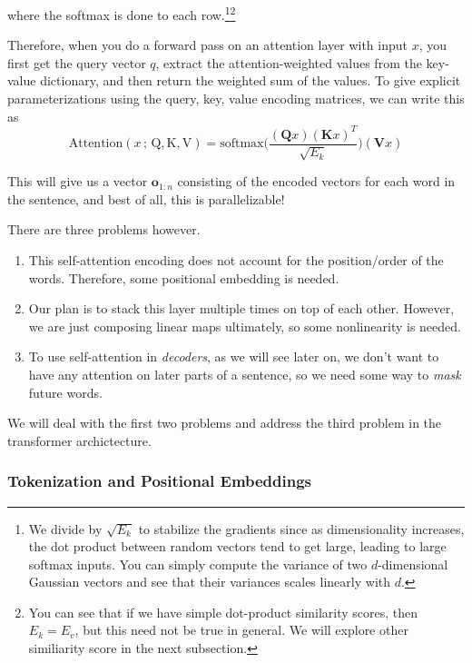 \begin{definition}
      where the softmax is done to each row.\footnote{We divide by $\sqrt{E_k}$ to stabilize the gradients since as dimensionality increases, the dot product between random vectors tend to get large, leading to large softmax inputs. You can simply compute the variance of two $d$-dimensional Gaussian vectors and see that their variances scales linearly with $d$. }\footnote{You can see that if we have simple dot-product similarity scores, then $E_k = E_v$, but this need not be true in general. We will explore other similiarity score in the next subsection. } 

      Therefore, when you do a forward pass on an attention layer with input $x$, you first get the query vector $q$, extract the attention-weighted values from the key-value dictionary, and then return the weighted sum of the values. To give explicit parameterizations using the query, key, value encoding matrices, we can write this as 
      \begin{equation} 
        \mathrm{Attention}(x \,;\, \mathrm{Q}, \mathrm{K}, \mathrm{V}) = \mathrm{softmax} \bigg( \frac{(\mathbf{Q}x)(\mathbf{K} x)^T}{\sqrt{E_k}} \bigg) (\mathbf{V} x)
      \end{equation}

      This will give us a vector $\mathbf{o}_{1:n}$ consisting of the encoded vectors for each word in the sentence, and best of all, this is parallelizable! 
    \end{definition}

    There are three problems however. 
    \begin{enumerate}
      \item This self-attention encoding does not account for the position/order of the words. Therefore, some positional embedding is needed. 
      \item Our plan is to stack this layer multiple times on top of each other. However, we are just composing linear maps ultimately, so some nonlinearity is needed. 
      \item To use self-attention in \textit{decoders}, as we will see later on, we don't want to have any attention on later parts of a sentence, so we need some way to \textit{mask} future words. 
    \end{enumerate}

    We will deal with the first two problems and address the third problem in the transformer archictecture. 

  \subsubsection{Tokenization and Positional Embeddings}

